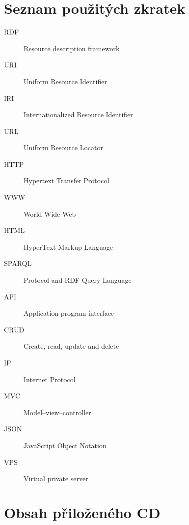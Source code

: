 \documentclass[thesis=B,czech]{FITthesis}[2012/06/26]
\begin{document}



\appendix

\chapter{Seznam použitých zkratek}
\begin{description}
	\item[RDF] Resource description framework
	\item[URI] Uniform Resource Identifier
	\item[IRI] Internationalized Resource Identifier
	\item[URL] Uniform Resource Locator
	\item[HTTP] Hypertext Transfer Protocol
	\item[WWW] World Wide Web
	\item[HTML] HyperText Markup Language
	\item[SPARQL] Protocol and RDF Query Language
	\item[API] Application program interface
	\item[CRUD] Create, read, update and delete
	\item[IP] Internet Protocol 
	\item[MVC] Model–view–controller
	\item[JSON] JavaScript Object Notation
	\item[VPS] Virtual private server
\end{description}


\chapter{Obsah přiloženého CD}
\begin{figure}[H]
\end{figure}
\end{document}
